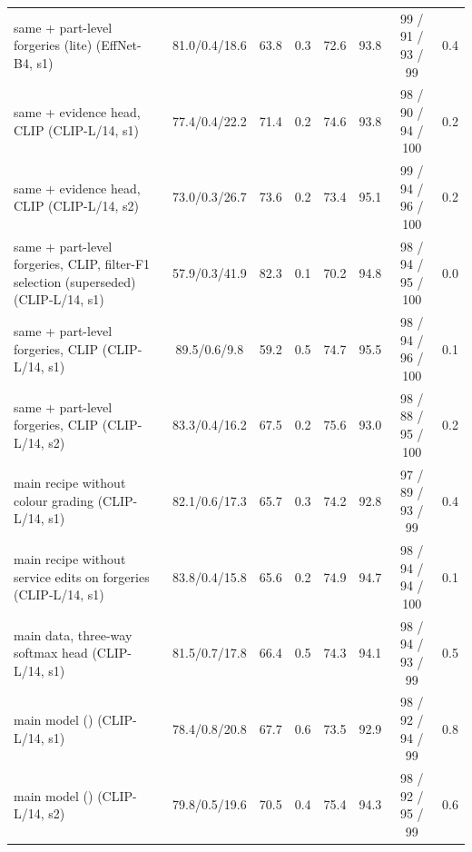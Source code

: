 \begin{tabular}{l c cc c c c c}
same + part-level forgeries (lite) (EffNet-B4, s1) & 81.0/0.4/18.6 & 63.8 & 0.3 & 72.6 & 93.8 & 99 / 91 / 93 / 99 & 0.4 \\
same + evidence head, CLIP (CLIP-L/14, s1) & 77.4/0.4/22.2 & 71.4 & 0.2 & 74.6 & 93.8 & 98 / 90 / 94 / 100 & 0.2 \\
same + evidence head, CLIP (CLIP-L/14, s2) & 73.0/0.3/26.7 & 73.6 & 0.2 & 73.4 & 95.1 & 99 / 94 / 96 / 100 & 0.2 \\
same + part-level forgeries, CLIP, filter-F1 selection (superseded) (CLIP-L/14, s1) & 57.9/0.3/41.9 & 82.3 & 0.1 & 70.2 & 94.8 & 98 / 94 / 95 / 100 & 0.0 \\
same + part-level forgeries, CLIP (CLIP-L/14, s1) & 89.5/0.6/9.8 & 59.2 & 0.5 & 74.7 & 95.5 & 98 / 94 / 96 / 100 & 0.1 \\
same + part-level forgeries, CLIP (CLIP-L/14, s2) & 83.3/0.4/16.2 & 67.5 & 0.2 & 75.6 & 93.0 & 98 / 88 / 95 / 100 & 0.2 \\
main recipe without colour grading (CLIP-L/14, s1) & 82.1/0.6/17.3 & 65.7 & 0.3 & 74.2 & 92.8 & 97 / 89 / 93 / 99 & 0.4 \\
main recipe without service edits on forgeries (CLIP-L/14, s1) & 83.8/0.4/15.8 & 65.6 & 0.2 & 74.9 & 94.7 & 98 / 94 / 94 / 100 & 0.1 \\
main data, three-way softmax head (CLIP-L/14, s1) & 81.5/0.7/17.8 & 66.4 & 0.5 & 74.3 & 94.1 & 98 / 94 / 93 / 99 & 0.5 \\
main model (\ours{}) (CLIP-L/14, s1) & 78.4/0.8/20.8 & 67.7 & 0.6 & 73.5 & 92.9 & 98 / 92 / 94 / 99 & 0.8 \\
main model (\ours{}) (CLIP-L/14, s2) & 79.8/0.5/19.6 & 70.5 & 0.4 & 75.4 & 94.3 & 98 / 92 / 95 / 99 & 0.6 \\
\bottomrule
\end{tabular}
